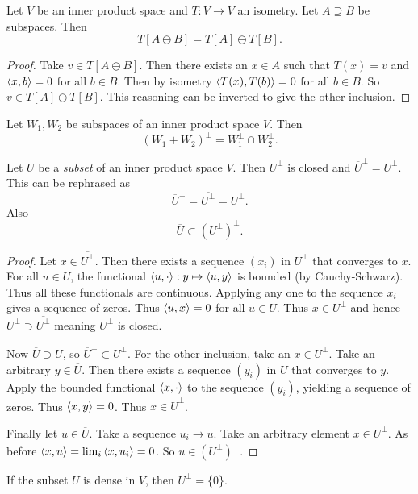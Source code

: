 \begin{proposition} \label{prop:ominusUnderIsometry}
Let $V$ be an inner product space and $T:V\to V$ an isometry. Let $A\supseteq B$ be subspaces. Then
\[ T[A\ominus B] = T[A]\ominus T[B]. \]
\end{proposition}
\begin{proof}
Take $v\in T[A\ominus B]$. Then there exists an $x\in A$ such that $T(x) = v$ and $\left\langle x,b \right\rangle=0$ for all $b\in B$. Then by isometry $\left\langle T(x), T(b) \right\rangle=0$ for all $b\in B$. So $v\in T[A]\ominus T[B]$. This reasoning can be inverted to give the other inclusion. 
\end{proof}

\begin{proposition} \label{prop:linearDeMorgan}
Let $W_1,W_2$ be subspaces of an inner product space $V$. Then
\[ (W_1+W_2)^\perp = W_1^\perp \cap W_2^\perp. \]
\end{proposition}
\begin{proposition} \label{prop:orthogonalComplementClosed}
Let $U$ be a \emph{subset} of an inner product space $V$. Then $U^\perp$ is closed and $\overline{U}^\perp = U^\perp$. This can be rephrased as
\[ \overline{U}^\perp = \overline{U^\perp} = U^\perp. \]
Also
\[\overline{U} \subset (U^\perp)^\perp. \]
\end{proposition}
\begin{proof}
Let $x\in \overline{U^\perp}$. Then there exists a sequence $(x_i)$ in $U^\perp$ that converges to $x$. For all $u\in U$, the functional $\left\langle u,\cdot \right\rangle:y\mapsto \left\langle u,y \right\rangle$ is bounded (by Cauchy-Schwarz). Thus all these functionals are continuous. Applying any one to the sequence $x_i$ gives a sequence of zeros. Thus $\left\langle u,x \right\rangle = 0$ for all $u\in U$. Thus $x\in U^\perp$ and hence $U^\perp \supset \overline{U^\perp}$ meaning $U^\perp$ is closed.

Now $\overline{U}\supset U$, so $\overline{U}^\perp \subset U^\perp$. For the other inclusion, take an $x\in U^\perp$. Take an arbitrary $y\in \overline{U}$. Then there exists a sequence $(y_i)$ in $U$ that converges to $y$. Apply the bounded functional $\left\langle x,\cdot \right\rangle$ to the sequence $(y_i)$, yielding a sequence of zeros. Thus $\left\langle x,y \right\rangle=0$. Thus $x\in \overline{U}^\perp$.

Finally let $u\in \overline{U}$. Take a sequence $u_i\to u$. Take an arbitrary element $x\in U^\perp$. As before $\left\langle x,u \right\rangle = \lim_i\left\langle x,u_i \right\rangle = 0$. So $u\in (U^\perp)^\perp$.
\end{proof}
\begin{corollary} \label{corollary:orthogonalComplementClosed}
If the subset $U$ is dense in $V$, then $U^\perp = \{0\}$. 
\end{corollary}
